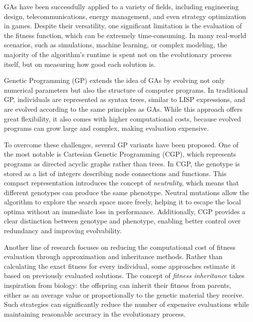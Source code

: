 \documentclass[12pt,a4paper]{report}
\begin{document}
\par GAs have been successfully applied to a variety of fields, including engineering design, telecommunications, energy management, and even strategy optimization in games. Despite their versatility, one significant limitation is the evaluation of the fitness function, which can be extremely time-consuming. In many real-world scenarios, such as simulations, machine learning, or complex modeling, the majority of the algorithm's runtime is spent not on the evolutionary process itself, but on measuring how good each solution is.

\par Genetic Programming (GP) extends the idea of GAs by evolving not only numerical parameters but also the structure of computer programs. In traditional GP, individuals are represented as syntax trees, similar to LISP expressions, and are evolved according to the same principles as GAs. While this approach offers great flexibility, it also comes with higher computational costs, because evolved programs can grow large and complex, making evaluation expensive.

\par To overcome these challenges, several GP variants have been proposed. One of the most notable is Cartesian Genetic Programming (CGP), which represents programs as directed acyclic graphs rather than trees. In CGP, the genotype is stored as a list of integers describing node connections and functions. This compact representation introduces the concept of \textit{neutrality}, which means that different genotypes can produce the same phenotype. Neutral mutations allow the algorithm to explore the search space more freely, helping it to escape the local optima without an immediate loss in performance. Additionally, CGP provides a clear distinction between genotype and phenotype, enabling better control over redundancy and improving evolvability.

\par Another line of research focuses on reducing the computational cost of fitness evaluation through approximation and inheritance methods. Rather than calculating the exact fitness for every individual, some approaches estimate it based on previously evaluated solutions. The concept of \textit{fitness inheritance} takes inspiration from biology: the offspring can inherit their fitness from parents, either as an average value or proportionally to the genetic material they receive. Such strategies can significantly reduce the number of expensive evaluations while maintaining reasonable accuracy in the evolutionary process.
\end{document}
